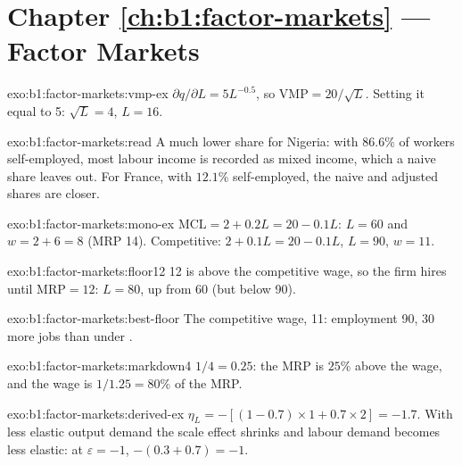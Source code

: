 \section*{Chapter \ref{ch:b1:factor-markets} --- Factor Markets}

\begin{solution}{exo:b1:factor-markets:vmp-ex}
$\partial q/\partial L = 5L^{-0.5}$, so $\mathrm{VMP} = 20/\sqrt L$. Setting it equal to 5: $\sqrt L = 4$, $L = 16$.
\end{solution}

\begin{solution}{exo:b1:factor-markets:read}
A much lower share for Nigeria: with $86.6\%$ of workers self-employed, most
labour income is recorded as mixed income, which a naive share leaves out.
For France, with $12.1\%$ self-employed, the naive and adjusted shares are
closer.
\end{solution}

\begin{solution}{exo:b1:factor-markets:mono-ex}
$\mathrm{MCL} = 2 + 0.2L = 20 - 0.1L$: $L = 60$ and $w = 2 + 6 = 8$ (MRP 14). Competitive:
$2 + 0.1L = 20 - 0.1L$, $L = 90$, $w = 11$.
\end{solution}

\begin{solution}{exo:b1:factor-markets:floor12}
12 is above the competitive wage, so the firm hires until $\mathrm{MRP} = 12$:
$L = 80$, up from 60 (but below 90).
\end{solution}

\begin{solution}{exo:b1:factor-markets:best-floor}
The competitive wage, 11: employment 90, 30 more jobs than under .
\end{solution}

\begin{solution}{exo:b1:factor-markets:markdown4}
$1/4 = 0.25$: the MRP is $25\%$ above the wage, and the wage is $1/1.25 = 80\%$ of the
MRP.
\end{solution}

\begin{solution}{exo:b1:factor-markets:derived-ex}
$\eta_L = -[(1 - 0.7) \times 1 + 0.7 \times 2] = -1.7$. With less elastic output demand the
scale effect shrinks and labour demand becomes less elastic: at $\varepsilon = -1$,
$-(0.3 + 0.7) = -1$.
\end{solution}

